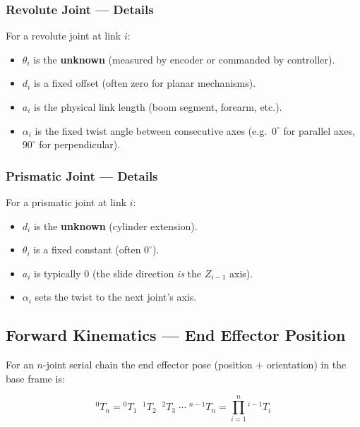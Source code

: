 \documentclass[12pt,a4paper]{article}
\begin{document}
\subsubsection*{Revolute Joint --- Details}

For a revolute joint at link $i$:
\begin{itemize}
  \item $\theta_i$ is the \textbf{unknown} (measured by encoder or
        commanded by controller).
  \item $d_i$ is a fixed offset (often zero for planar mechanisms).
  \item $a_i$ is the physical link length (boom segment, forearm, etc.).
  \item $\alpha_i$ is the fixed twist angle between consecutive axes
        (e.g.\ $0^\circ$ for parallel axes, $90^\circ$ for
        perpendicular).
\end{itemize}

\subsubsection*{Prismatic Joint --- Details}

For a prismatic joint at link $i$:
\begin{itemize}
  \item $d_i$ is the \textbf{unknown} (cylinder extension).
  \item $\theta_i$ is a fixed constant (often $0^\circ$).
  \item $a_i$ is typically $0$ (the slide direction \emph{is} the
        $Z_{i-1}$ axis).
  \item $\alpha_i$ sets the twist to the next joint's axis.
\end{itemize}

\subsection{Forward Kinematics --- End Effector Position}

For an $n$-joint serial chain the end effector pose (position $+$
orientation) in the base frame is:

\begin{equation}
\boxed{
  {}^{0}T_n = {}^{0}T_1 \;\; {}^{1}T_2 \;\; {}^{2}T_3 \;\cdots\;
  {}^{n-1}T_n
  = \prod_{i=1}^{n} {}^{i-1}T_i
}
\label{eq:FK}
\end{equation}
\end{document}
